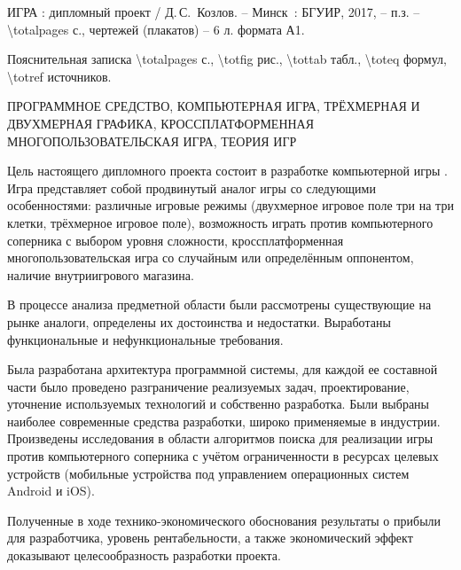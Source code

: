 \thispagestyle{empty}


\MakeUppercase{Игра \BinaryWars :} дипломный проект / Д.\,С.~Козлов. -- Минск~: БГУИР, 2017, -- п.з. -- \num{\totalpages} с., чертежей (плакатов) -- \num{6} л. формата А1.

\vspace{1\parsep}

Пояснительная записка \num{\totalpages} с., \num{\totfig} рис., \num{\tottab} табл., \num{\toteq} формул, \num{\totref} источников.

\vspace{1\parsep}

\MakeUppercase{Программное средство, компьютерная игра, трёхмерная и двухмерная графика, кроссплатформенная многопользовательская игра, теория игр}

\vspace{1\parsep}

Цель настоящего дипломного проекта состоит в разработке компьютерной игры \BinaryWars. Игра представляет собой продвинутый аналог игры \TicTacToe со следующими особенностями: различные игровые режимы (двухмерное игровое поле три на три клетки, трёхмерное игровое поле), возможность играть против компьютерного соперника с выбором уровня сложности, кроссплатформенная многопользовательская игра со случайным или определённым оппонентом, наличие внутриигрового магазина.

В процессе анализа предметной области были рассмотрены существующие на рынке аналоги, определены их достоинства и недостатки. Выработаны функциональные и нефункциональные требования.

Была разработана архитектура программной системы, для каждой ее составной части было проведено разграничение реализуемых задач, проектирование, уточнение используемых технологий и собственно разработка. Были выбраны наиболее современные средства разработки, широко применяемые в индустрии. Произведены исследования в области алгоритмов поиска для реализации игры против компьютерного соперника с учётом ограниченности в ресурсах целевых устройств (мобильные устройства под управлением операционных систем Android и iOS).

Полученные в ходе технико-экономического обоснования результаты о прибыли для разработчика, уровень рентабельности, а также экономический эффект доказывают целесообразность разработки проекта.